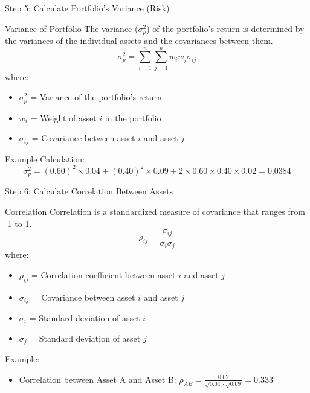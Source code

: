 \documentclass{beamer}
\begin{document}
\begin{frame}{Step 5: Calculate Portfolio's Variance (Risk)}
  \begin{block}{Variance of Portfolio}
    The variance (\(\sigma_p^2\)) of the portfolio's return is determined by the variances of the individual assets and the covariances between them.
    \begin{equation*}
      \sigma_p^2 = \sum_{i=1}^{n} \sum_{j=1}^{n} w_i w_j \sigma_{ij}
    \end{equation*}
    where:
    \begin{itemize}
      \item \( \sigma_p^2 \) = Variance of the portfolio's return
      \item \( w_i \) = Weight of asset \( i \) in the portfolio
      \item \( \sigma_{ij} \) = Covariance between asset \( i \) and asset \( j \)
    \end{itemize}
    Example Calculation:
    \begin{equation*}
      \sigma_p^2 = (0.60)^2 \times 0.04 + (0.40)^2 \times 0.09 + 2 \times 0.60 \times 0.40 \times 0.02 = 0.0384
    \end{equation*}
  \end{block}
\end{frame}

\begin{frame}{Step 6: Calculate Correlation Between Assets}
  \begin{block}{Correlation}
    Correlation is a standardized measure of covariance that ranges from -1 to 1.
    \begin{equation*}
      \rho_{ij} = \frac{\sigma_{ij}}{\sigma_i \sigma_j}
    \end{equation*}
    where:
    \begin{itemize}
      \item \( \rho_{ij} \) = Correlation coefficient between asset \( i \) and asset \( j \)
      \item \( \sigma_{ij} \) = Covariance between asset \( i \) and asset \( j \)
      \item \( \sigma_i \) = Standard deviation of asset \( i \)
      \item \( \sigma_j \) = Standard deviation of asset \( j \)
    \end{itemize}
    Example:
    \begin{itemize}
      \item Correlation between Asset A and Asset B: \(\rho_{AB} = \frac{0.02}{\sqrt{0.04} \cdot \sqrt{0.09}} = 0.333\)
    \end{itemize}
  \end{block}
\end{frame}
\end{document}
